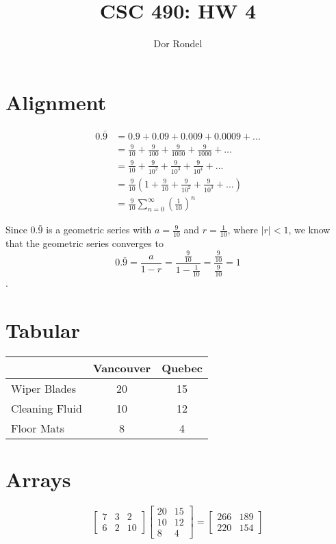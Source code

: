 \documentclass[11pt]{article}
\title{CSC 490: HW 4}
\author{Dor Rondel}
\begin{document}
\section{Alignment}

\begin{align*}
0.\bar{9} &= 0.9 + 0.09 + 0.009 + 0.0009 + ... \\
          &= \frac{9}{10} + \frac{9}{100} + \frac{9}{1000} + \frac{9}{1000} + ... \\
          &= \frac{9}{10} + \frac{9}{10^2} + \frac{9}{10^3} + \frac{9}{10^4} + ... \\
          &= \frac{9}{10}(1 + \frac{9}{10} + \frac{9}{10^2} + \frac{9}{10^3} + ...) \\
          &= \frac{9}{10}\sum_{n=0}^{\infty}(\frac{1}{10})^n
\end{align*}

Since $0.\bar{9}$ is a geometric series with $a = \frac{9}{10}$ and $r = \frac{1}{10}$, where $|r| < 1$, we know that the geometric series converges to
$$ 
   0.\bar{9} = 
   \frac{a}{1-r} = 
   \frac{\frac{9}{10}}{1-\frac{1}{10}} =
   \frac{\frac{9}{10}}{\frac{9}{10}} = 1 
$$ 
.  

\section{Tabular}
\begin{center}
\begin{tabular}{l|c|c}
 & Vancouver & Quebec \\
\hline
Wiper Blades & 20 & 15\\
\hline
Cleaning Fluid & 10 & 12\\
\hline
Floor Mats & 8 & 4\\
\end{tabular}
\end{center}

\section{Arrays}

\[
\begin{bmatrix}
  7 & 3 & 2 \\ 6 & 2 & 10
\end{bmatrix}
\begin{bmatrix}
  20 & 15 \\ 10 & 12 \\ 8 & 4
\end{bmatrix}
=
\begin{bmatrix}
  266 & 189 \\ 220 & 154
\end{bmatrix}
\]
\end{document}
